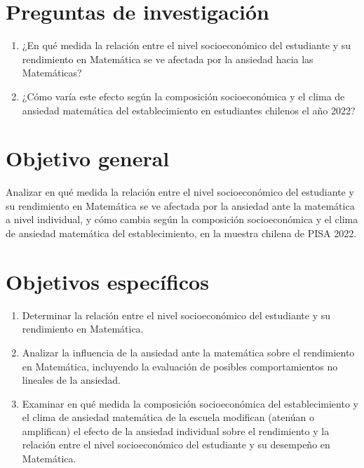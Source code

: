 \documentclass[
  spanish,
  a4paper,
  oneside]{scrbook}
\begin{document}
\section{Preguntas de
investigación}\label{preguntas-de-investigaciuxf3n}

\begin{enumerate}
\def\labelenumi{\arabic{enumi}.}
\item
  ¿En qué medida la relación entre el nivel socioeconómico del
  estudiante y su rendimiento en Matemática se ve afectada por la
  ansiedad hacia las Matemáticas?
\item
  ¿Cómo varía este efecto según la composición socioeconómica y el clima
  de ansiedad matemática del establecimiento en estudiantes chilenos el
  año 2022?
\end{enumerate}

\section{Objetivo general}\label{objetivo-general}

Analizar en qué medida la relación entre el nivel socioeconómico del
estudiante y su rendimiento en Matemática se ve afectada por la ansiedad
ante la matemática a nivel individual, y cómo cambia según la
composición socioeconómica y el clima de ansiedad matemática del
establecimiento, en la muestra chilena de PISA 2022.

\section{Objetivos específicos}\label{objetivos-especuxedficos}

\begin{enumerate}
\def\labelenumi{\arabic{enumi}.}
\item
  Determinar la relación entre el nivel socioeconómico del estudiante y
  su rendimiento en Matemática.
\item
  Analizar la influencia de la ansiedad ante la matemática sobre el
  rendimiento en Matemática, incluyendo la evaluación de posibles
  comportamientos no lineales de la ansiedad.
\item
  Examinar en qué medida la composición socioeconómica del
  establecimiento y el clima de ansiedad matemática de la escuela
  modifican (atenúan o amplifican) el efecto de la ansiedad individual
  sobre el rendimiento y la relación entre el nivel socioeconómico del
  estudiante y su desempeño en Matemática.
\end{enumerate}
\end{document}

